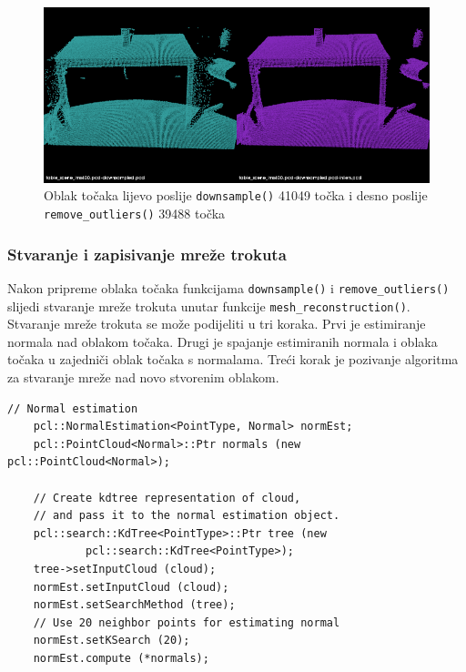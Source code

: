 \begin{figure}[h]
\centering
\includegraphics[scale=0.5]{figures/tablescene-remove-outliers-example.png}
\caption{Oblak točaka lijevo poslije \texttt{downsample()} 41049 točka i desno poslije
\texttt{remove\_outliers()} 39488 točka }
\label{fig:tablescene-outliers}
\end{figure}


\newpage
\subsubsection{Stvaranje i zapisivanje mreže trokuta} %
\label{ssub:Stvaranje i zapisivanje mreže trokuta}

Nakon pripreme oblaka točaka funkcijama \texttt{downsample()} i
\texttt{remove\_outliers()} slijedi stvaranje mreže trokuta unutar
funkcije \texttt{mesh\_reconstruction()}. Stvaranje mreže trokuta se
može podijeliti u tri koraka. Prvi je estimiranje normala nad oblakom
točaka. Drugi je spajanje estimiranih normala i oblaka točaka u
zajedniči oblak točaka s normalama. Treći korak je pozivanje algoritma
za stvaranje mreže nad novo stvorenim oblakom.

\begin{lstlisting}[label=lstStvaranje1, caption={Dio izvornog koda za
    estimaciji normala iz funkcije \texttt{reconstruct\_mesh()} }]
    // Normal estimation
    pcl::NormalEstimation<PointType, Normal> normEst;
    pcl::PointCloud<Normal>::Ptr normals (new pcl::PointCloud<Normal>);
    
    // Create kdtree representation of cloud, 
    // and pass it to the normal estimation object. 
    pcl::search::KdTree<PointType>::Ptr tree (new
            pcl::search::KdTree<PointType>);
    tree->setInputCloud (cloud);
    normEst.setInputCloud (cloud);
    normEst.setSearchMethod (tree);
    // Use 20 neighbor points for estimating normal
    normEst.setKSearch (20);
    normEst.compute (*normals);
\end{lstlisting}

